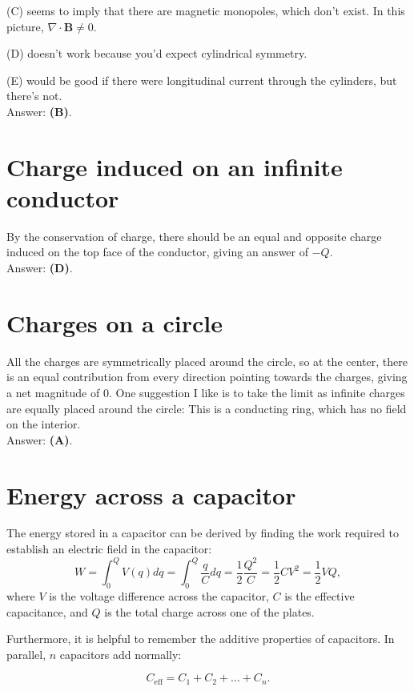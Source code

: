 \documentclass[11pt]{paper}
\newcommand{\answer}[1]{Answer: \textbf{(#1)}.}
\begin{document}
(C) seems to imply that there are magnetic monopoles, which don't exist.  In this picture, $\nabla \cdot \mathbf{B} \neq 0$.

(D) doesn't work because you'd expect cylindrical symmetry.

(E) would be good if there were longitudinal current through the cylinders, but there's not.\\

\answer{B}

\section{Charge induced on an infinite conductor}
By the conservation of charge, there should be an equal and opposite charge induced on the top face of the conductor, giving an answer of $-Q$.\\

\answer{D}

\section{Charges on a circle}
All the charges are symmetrically placed around the circle, so at the center, there is an equal contribution from every direction pointing towards the charges, giving a net magnitude of 0.  One suggestion I like is to take the limit as infinite charges are equally placed around the circle:  This is a conducting ring, which has no field on the interior.\\

\answer{A}

\section{Energy across a capacitor}
The energy stored in a capacitor can be derived by finding the work required to establish an electric field in the capacitor:
\begin{equation}
W = \int_0^Q V(q) dq = \int_0^Q \frac{q}{C} dq = \frac{1}{2} \frac{Q^2}{C} = \frac{1}{2} CV^2 = \frac{1}{2} V Q,
\end{equation}
where $V$ is the voltage difference across the capacitor, $C$ is the effective capacitance, and $Q$ is the total charge across one of the plates.

Furthermore, it is helpful to remember the additive properties of capacitors.  In parallel, $n$ capacitors add normally:

\begin{equation}
C_{\text{eff}} = C_1 + C_2 + \dots + C_n.
\end{equation}
\end{document}
